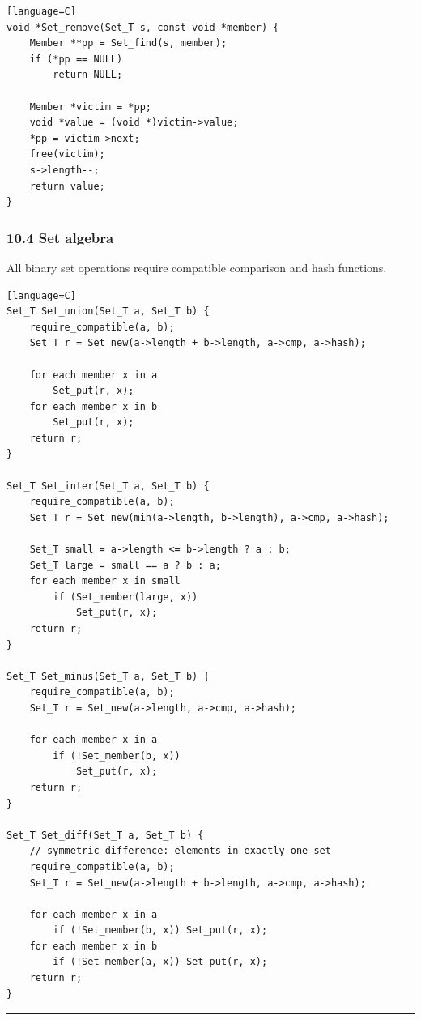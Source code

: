 \documentclass[11pt]{article}
\begin{document}
\begin{verbatim}[language=C]
void *Set_remove(Set_T s, const void *member) {
    Member **pp = Set_find(s, member);
    if (*pp == NULL)
        return NULL;

    Member *victim = *pp;
    void *value = (void *)victim->value;
    *pp = victim->next;
    free(victim);
    s->length--;
    return value;
}
\end{verbatim}

\subsubsection{10.4 Set algebra}\label{set-algebra}

All binary set operations require compatible comparison and hash functions.

\begin{verbatim}[language=C]
Set_T Set_union(Set_T a, Set_T b) {
    require_compatible(a, b);
    Set_T r = Set_new(a->length + b->length, a->cmp, a->hash);

    for each member x in a
        Set_put(r, x);
    for each member x in b
        Set_put(r, x);
    return r;
}

Set_T Set_inter(Set_T a, Set_T b) {
    require_compatible(a, b);
    Set_T r = Set_new(min(a->length, b->length), a->cmp, a->hash);

    Set_T small = a->length <= b->length ? a : b;
    Set_T large = small == a ? b : a;
    for each member x in small
        if (Set_member(large, x))
            Set_put(r, x);
    return r;
}

Set_T Set_minus(Set_T a, Set_T b) {
    require_compatible(a, b);
    Set_T r = Set_new(a->length, a->cmp, a->hash);

    for each member x in a
        if (!Set_member(b, x))
            Set_put(r, x);
    return r;
}

Set_T Set_diff(Set_T a, Set_T b) {
    // symmetric difference: elements in exactly one set
    require_compatible(a, b);
    Set_T r = Set_new(a->length + b->length, a->cmp, a->hash);

    for each member x in a
        if (!Set_member(b, x)) Set_put(r, x);
    for each member x in b
        if (!Set_member(a, x)) Set_put(r, x);
    return r;
}
\end{verbatim}

\begin{center}\rule{0.5\linewidth}{0.5pt}\end{center}
\end{document}
